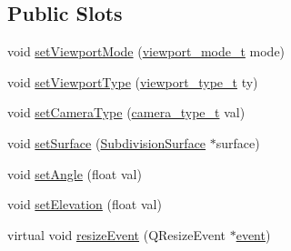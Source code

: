 \subsection*{Public Slots}
\begin{DoxyCompactItemize}
\item 
void \hyperlink{classShipCADGeometry_1_1Viewport_a578ac5ee96e36638739517fa21bf70c0}{set\-Viewport\-Mode} (\hyperlink{classShipCADGeometry_1_1Viewport_a32872391303d6fbcc5766df64933cc14}{viewport\-\_\-mode\-\_\-t} mode)
\item 
void \hyperlink{classShipCADGeometry_1_1Viewport_a554a3455c39ee5652b13c9b24c3c962e}{set\-Viewport\-Type} (\hyperlink{classShipCADGeometry_1_1Viewport_a97a32c07745357d09b8f282c69ea9199}{viewport\-\_\-type\-\_\-t} ty)
\item 
void \hyperlink{classShipCADGeometry_1_1Viewport_a5f90a885e0204b32ff9795c4b79f824b}{set\-Camera\-Type} (\hyperlink{classShipCADGeometry_1_1Viewport_ae11090e9e924e7014fdff5111cb93810}{camera\-\_\-type\-\_\-t} val)
\item 
void \hyperlink{classShipCADGeometry_1_1Viewport_a4bb2b85a12d7dd14e44b5d5c199cbda7}{set\-Surface} (\hyperlink{classShipCADGeometry_1_1SubdivisionSurface}{Subdivision\-Surface} $\ast$surface)
\item 
void \hyperlink{classShipCADGeometry_1_1Viewport_a00ba2139fa06701b65de70d5c657f5d6}{set\-Angle} (float val)
\item 
void \hyperlink{classShipCADGeometry_1_1Viewport_a4bda4b742dc477ed5dc2ab6ac7fe92bc}{set\-Elevation} (float val)
\item 
virtual void \hyperlink{classShipCADGeometry_1_1Viewport_a4eeeb100fd88487215bb7794bdf5e0cb}{resize\-Event} (Q\-Resize\-Event $\ast$\hyperlink{classOpenGLWindow_a1e3045cffb900de55b7384f5091c9d94}{event})
\end{DoxyCompactItemize}
